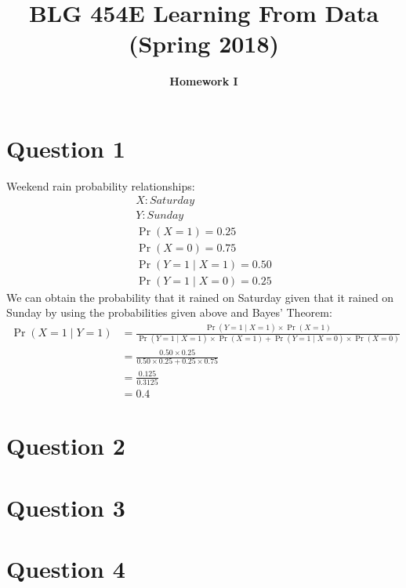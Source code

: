 \documentclass{article}
\DeclareMathOperator{\CondProb}{Pr}
\begin{document}
\title{\bf BLG 454E Learning From Data (Spring 2018)}
\author{\bf Homework I}
\date{}
\maketitle


\section{Question 1}
Weekend rain probability relationships:
\begin{equation*}
\begin{aligned}
	X : Saturday \\
	Y : Sunday \\
	\CondProb{(X = 1)} = 0.25 \\
	\CondProb{(X = 0)} = 0.75 \\
	\CondProb{(Y = 1  \mid X = 1)} = 0.50 \\
	\CondProb{(Y = 1  \mid X = 0)} = 0.25 
\end{aligned}
\end{equation*}
	We can obtain the probability that it rained on Saturday given that it rained on Sunday by using the probabilities given above and Bayes' Theorem:
\begin{equation*}
\begin{split}
	\CondProb{(X = 1  \mid Y = 1)} &=\frac{\CondProb{(Y = 1  \mid X = 1)}\times \CondProb{(X = 1)}}{\CondProb{(Y = 1  \mid X = 1)}\times \CondProb{(X = 1)} + \CondProb{(Y = 1  \mid X = 0)}\times \CondProb{(X = 0)}} \\
	&= \frac{0.50\times 0.25}{0.50\times 0.25 + 0.25\times 0.75} \\
	&= \frac{0.125}{0.3125} \\
	&= \boxed{0.4}
\end{split}
\end{equation*}
\section{Question 2}

\section{Question 3}

\section{Question 4}
\end{document}
